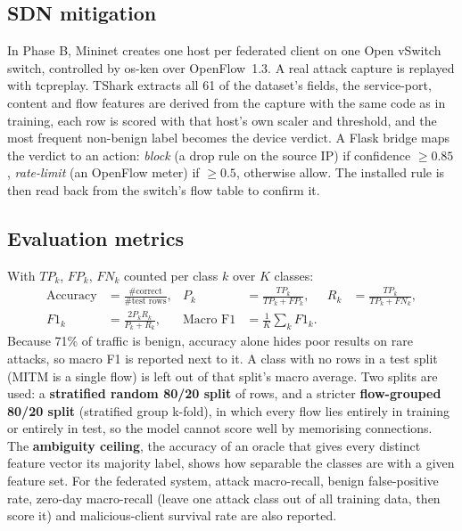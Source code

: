 \subsection{SDN mitigation}
In Phase B, Mininet creates one host per federated client on one Open vSwitch switch, controlled by os-ken over OpenFlow~1.3. A real attack capture is replayed with tcpreplay. TShark extracts all 61 of the dataset's fields, the service-port, content and flow features are derived from the capture with the same code as in training, each row is scored with that host's own scaler and threshold, and the most frequent non-benign label becomes the device verdict. A Flask bridge maps the verdict to an action: \emph{block} (a drop rule on the source IP) if confidence $\geq0.85$, \emph{rate-limit} (an OpenFlow meter) if $\geq0.5$, otherwise allow. The installed rule is then read back from the switch's flow table to confirm it.

\subsection{Evaluation metrics}
With $TP_k$, $FP_k$, $FN_k$ counted per class $k$ over $K$ classes:
\begin{align}
  \text{Accuracy} &= \frac{\#\text{correct}}{\#\text{test rows}}, &
  P_k &= \frac{TP_k}{TP_k+FP_k}, &
  R_k &= \frac{TP_k}{TP_k+FN_k},\\
  F1_k &= \frac{2P_kR_k}{P_k+R_k}, &
  \text{Macro F1} &= \frac{1}{K}\sum_{k}F1_k .
\end{align}
Because 71\% of traffic is benign, accuracy alone hides poor results on rare attacks, so macro F1 is reported next to it. A class with no rows in a test split (MITM is a single flow) is left out of that split's macro average. Two splits are used: a \textbf{stratified random 80/20 split} of rows, and a stricter \textbf{flow-grouped 80/20 split} (stratified group k-fold), in which every flow lies entirely in training or entirely in test, so the model cannot score well by memorising connections. The \textbf{ambiguity ceiling}, the accuracy of an oracle that gives every distinct feature vector its majority label, shows how separable the classes are with a given feature set. For the federated system, attack macro-recall, benign false-positive rate, zero-day macro-recall (leave one attack class out of all training data, then score it) and malicious-client survival rate are also reported.
